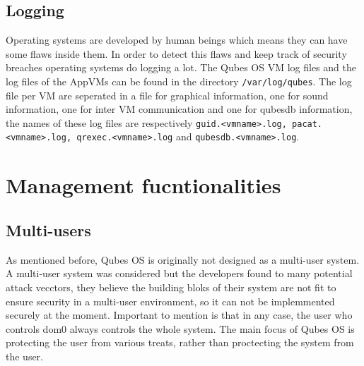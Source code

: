 \documentclass[runningheads,a4paper]{article}
\begin{document}
\subsection{Logging}
Operating systems are developed by human beings which means they can
have some flaws inside them. In order to detect this flaws and keep
track of security breaches operating systems do logging a lot. The
Qubes OS VM log files and the log files of the AppVMs can be found in
the directory \texttt{/var/log/qubes}. The log file per VM are
seperated in a file for graphical information, one for sound
information, one for inter VM communication and one for qubesdb
information, the names of these log files are respectively
\texttt{guid.<vmname>.log, pacat.<vmname>.log, qrexec.<vmname>.log}
and \texttt{qubesdb.<vmname>.log}.

\section{Management fucntionalities}
\subsection{Multi-users}
As mentioned before, Qubes OS is originally not designed as a
multi-user system.  A multi-user system was considered but the
developers found to many potential attack vecctors, they believe the
building bloks of their system are not fit to ensure security in a
multi-user environment, so it can not be implemmented securely at the
moment. Important to mention is that in any case, the user who
controls dom0 always controls the whole system. The main focus of
Qubes OS is protecting the user from various treats, rather than
proctecting the system from the user.
\end{document}
